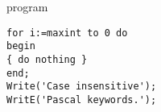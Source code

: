 \begin{defproblem}{program}
  \begin{onlyproblem}[fragile]
\lstset{language=Pascal}
\begin{lstlisting}
for i:=maxint to 0 do
begin
{ do nothing }
end;
Write('Case insensitive');
WritE('Pascal keywords.');
\end{lstlisting}
  \end{onlyproblem}
\end{defproblem}
